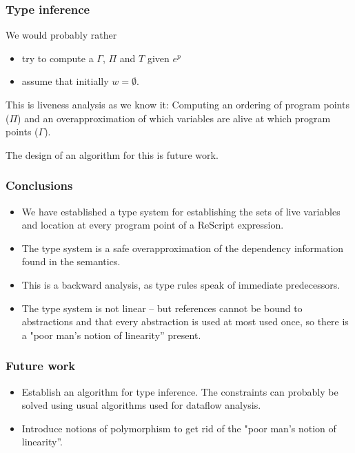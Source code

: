 \documentclass[aspectratio=169]{beamer}
\begin{document}
\begin{frame}
  \frametitle{Type inference}

  We would probably rather

  \begin{itemize}
  \item try to compute a $\Gamma$, $\Pi$ and $T$
    given $e^p$   
  \item assume that initially $w = \emptyset$.
  \end{itemize}

  This is liveness analysis as we know it: Computing an ordering of
  program points ($\Pi$) and an overapproximation of which variables
  are alive at which program points ($\Gamma$).

  The design of an algorithm for this is future work.
\end{frame}

\begin{frame}
  \frametitle{Conclusions}

  \begin{itemize}
 
  \item We have established a type system for establishing the sets of
    live variables and location at every program point of a ReScript
    expression.
  \item The type system is a safe overapproximation of the dependency
    information found in the semantics.
  \item This is a backward analysis, as type rules speak of immediate
    predecessors.
  \item The type system is not linear -- but references cannot be bound to
abstractions and that every abstraction is used at most used once, so
there is a "poor man's notion of linearity'' present.
  \end{itemize}
\end{frame}

\begin{frame}
  \frametitle{Future work}

  \begin{itemize}
  \item Establish an algorithm for type inference. The constraints can
    probably be solved using usual algorithms used for dataflow analysis.
  \item Introduce notions of polymorphism to get rid of the "poor man's notion of linearity''.
  \end{itemize}
\end{frame}
\end{document}
